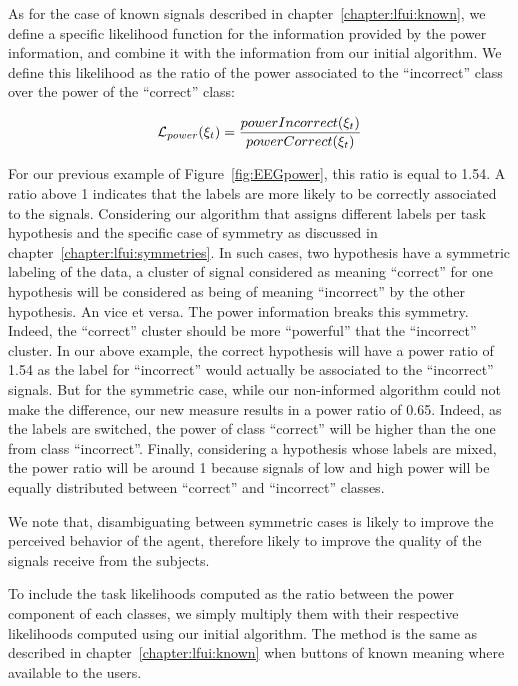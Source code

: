 As for the case of known signals described in chapter~\ref{chapter:lfui:known}, we define a specific likelihood function for the information provided by the power information, and combine it with the information from our initial algorithm. We define this likelihood as the ratio of the power associated to the ``incorrect'' class over the power of the ``correct'' class:

\begin{eqnarray}
\mathcal{L}_{power}(\xi_t) = \frac{powerIncorrect(\xi_t)}{powerCorrect(\xi_t)}
\label{eq:power}
\end{eqnarray}

For our previous example of Figure~\ref{fig:EEGpower}, this ratio is equal to 1.54. A ratio above 1 indicates that the labels are more likely to be correctly associated to the signals. Considering our algorithm that assigns different labels per task hypothesis and the specific case of symmetry as discussed in chapter~\ref{chapter:lfui:symmetries}. In such cases, two hypothesis have a symmetric labeling of the data, a cluster of signal considered as meaning ``correct'' for one hypothesis will be considered as being of meaning ``incorrect'' by the other hypothesis. An vice et versa. The power information breaks this symmetry. Indeed, the ``correct'' cluster should be more ``powerful'' that the ``incorrect'' cluster. In our above example, the correct hypothesis will have a power ratio of 1.54 as the label for ``incorrect'' would actually be associated to the ``incorrect'' signals. But for the symmetric case, while our non-informed algorithm could not make the difference, our new measure results in a power ratio of 0.65. Indeed, as the labels are switched, the power of class ``correct'' will be higher than the one from class ``incorrect''. Finally, considering a hypothesis whose labels are mixed, the power ratio will be around 1 because signals of low and high power will be equally distributed between ``correct'' and ``incorrect'' classes. 

We note that, disambiguating between symmetric cases is likely to improve the perceived behavior of the agent, therefore likely to improve the quality of the signals receive from the subjects. 




To include the task likelihoods computed as the ratio between the power component of each classes, we simply multiply them with their respective likelihoods computed using our initial algorithm. The method is the same as described in chapter~\ref{chapter:lfui:known} when buttons of known meaning where available to the users.


